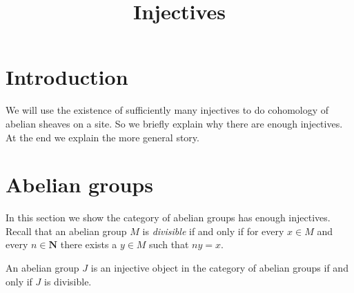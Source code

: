 

%


\title{Injectives}


\maketitle

\label{section-phantom}

\tableofcontents

\section{Introduction}
\label{section-introduction}

\noindent
We will use the existence of sufficiently many injectives to
do cohomology of abelian sheaves on a site. So we briefly
explain why there are enough injectives. At the end we explain
the more general story.

\section{Abelian groups}
\label{section-abelian-groups}

\noindent
In this section we show the category of abelian groups has enough
injectives. Recall that an abelian group $M$ is {\it divisible}
if and only if for every $x \in M$ and every $n \in \mathbf{N}$
there exists a $y \in M$ such that $n y = x$.

\begin{lemma}
\label{lemma-injective-abelian}
An abelian group $J$ is an injective object in
the category of abelian groups if and only if $J$
is divisible.
\end{lemma}


